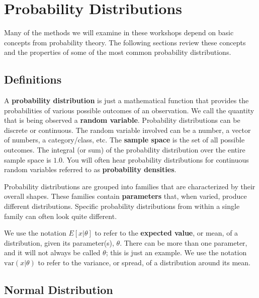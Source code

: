 \chapter{Probability Distributions \label{chapter:probabilitydistributions}}

Many of the methods we will examine in these workshops depend on basic concepts from probability theory. The following sections review these concepts and the properties of some of the most common probability distributions. 

\section{Definitions}

A \textbf{probability distribution} is just a mathematical function that provides the probabilities of various possible outcomes of an observation. We call the quantity that is being observed a \textbf{random variable}. Probability distributions can be discrete or continuous. The random variable involved can be a number, a vector of numbers, a category/class, etc. The \textbf{sample space} is the set of all possible outcomes. The integral (or sum) of the probability distribution over the entire sample space is $1.0$. You will often hear probability distributions for continuous random variables referred to as \textbf{probability densities}. 

Probability distributions are grouped into families that are characterized by their overall shapes. These families contain \textbf{parameters} that, when varied, produce different distributions. Specific probability distributions from within a single family can often look quite different. 

We use the notation $E[x|\theta]$ to refer to the \textbf{expected value}, or mean, of a distribution, given its parameter(s), $\theta$. There can be more than one parameter, and it will not always be called $\theta$; this is just an example. We use the notation $\text{var}(x|\theta)$ to refer to the variance, or spread, of a distribution around its mean. 

\section{Normal Distribution} 

